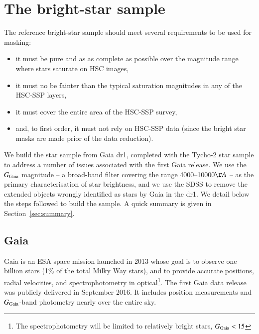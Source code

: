 \documentclass[11pt,a4paper,oneside,final]{scrartcl}
\begin{document}
\section{The bright-star sample}
\label{sec:catalogue}

The reference bright-star sample should meet several requirements to be used for masking:
\begin{itemize}
\item it must be pure and as as complete as possible over the magnitude range where stars saturate on HSC images,
\item it must no be fainter than the typical saturation magnitudes in any of the HSC-SSP layers,
\item it must cover the entire area of the HSC-SSP survey,
\item and, to first order, it must not rely on HSC-SSP data (since the bright star masks are made prior of the data reduction).
\end{itemize}

We build the star sample from Gaia dr1, completed with the Tycho-2 star sample to address a number of issues associated with the first Gaia release. We use the $G_{\rm Gaia}$ magnitude -- a broad-band filter covering the range 4000--10000$\AA$ -- as the primary characterisation of star brightness, and we use the SDSS to remove the extended objects wrongly identified as stars by Gaia in the dr1. We detail below the steps followed to build the sample. A quick summary is given in Section~\ref{sec:summary}.

\subsection{Gaia}

Gaia \citep{Gaia-Collaboration:2016ab} is an ESA space mission launched in 2013 whose goal is to observe one billion stars (1\% of the total Milky Way stars), and to provide accurate positions, radial velocities, and spectrophotometry in optical\footnote{The spectrophotometry will be limited to relatively bright stars, $G_{\rm Gaia} < 15$}. The first Gaia data release \citep{Gaia-Collaboration:2016aa} was publicly delivered in September 2016. It includes position measurements and $G_{\rm Gaia}$-band photometry nearly over the entire sky. 
\end{document}

